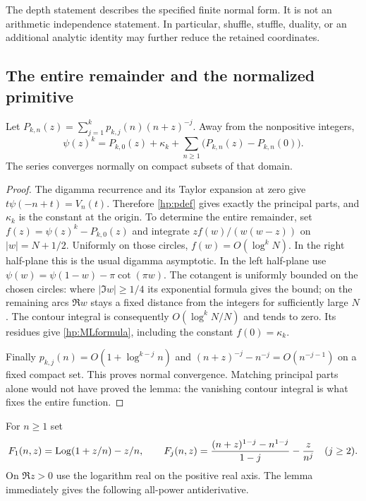 The depth statement describes the specified finite normal form.
It is not an arithmetic independence statement. In particular,
shuffle, stuffle, duality, or an additional analytic identity may
further reduce the retained coordinates.

\subsection{The entire remainder and the normalized primitive}

\begin{lemma}\label{hp:ML}
Let $P_{k,n}(z)=\sum_{j=1}^kp_{k,j}(n)(n+z)^{-j}$. Away from the
nonpositive integers,
\begin{equation}\label{hp:MLformula}
 \psi(z)^k=P_{k,0}(z)+\kappa_k+
                    \sum_{n\ge1}\bigl(P_{k,n}(z)-P_{k,n}(0)\bigr).
\end{equation}
The series converges normally on compact subsets of that domain.
\end{lemma}

\begin{proof}
The digamma recurrence and its Taylor expansion at zero give
$t\psi(-n+t)=V_n(t)$. Therefore \eqref{hp:pdef} gives exactly the
principal parts, and $\kappa_k$ is the constant at the origin.
To determine the entire remainder, set $f(z)=\psi(z)^k-P_{k,0}(z)$
and integrate $zf(w)/(w(w-z))$ on $|w|=N+1/2$.
Uniformly on those circles, $f(w)=O(\log^kN)$.
In the right half-plane this is the usual digamma asymptotic.
In the left half-plane use
$\psi(w)=\psi(1-w)-\pi\cot(\pi w)$. The cotangent is uniformly
bounded on the chosen circles: where $|\Im w|\ge1/4$ its exponential
formula gives the bound; on the remaining arcs $\Re w$ stays a fixed
distance from the integers for sufficiently large $N$.
The contour integral is consequently $O(\log^kN/N)$ and tends to zero.
Its residues give \eqref{hp:MLformula}, including the constant
$f(0)=\kappa_k$.

Finally $p_{k,j}(n)=O(1+\log^{k-j}n)$ and
$(n+z)^{-j}-n^{-j}=O(n^{-j-1})$ on a fixed compact set.
This proves normal convergence. Matching principal parts alone
would not have proved the lemma: the vanishing contour integral
is what fixes the entire function.
\end{proof}

For $n\ge1$ set
\[
 F_1(n,z)=\operatorname{Log}(1+z/n)-z/n,\qquad
 F_j(n,z)=\frac{(n+z)^{1-j}-n^{1-j}}{1-j}-\frac{z}{n^j}
 \quad(j\ge2).
\]
On $\Re z>0$ use the logarithm real on the positive real axis.
The lemma immediately gives the following all-power antiderivative.

